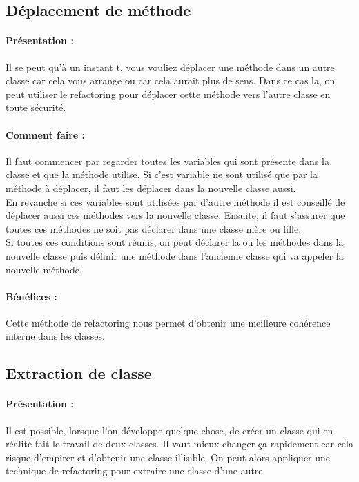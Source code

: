 \documentclass[a4paper,twoside,12pt,openright]{report}
\begin{document}
\subsection{Déplacement de méthode}
\paragraph{Présentation :}
Il se peut qu'à un instant t, vous vouliez déplacer une méthode dans un autre classe car cela vous arrange ou car cela aurait plus de sens. Dans ce cas la, on peut utiliser le refactoring pour déplacer cette méthode vers l'autre classe en toute sécurité.

\paragraph{Comment faire :}
Il faut commencer par regarder toutes les variables qui sont présente dans la classe et que la méthode utilise. Si c'est variable ne sont utilisé que par la méthode à déplacer, il faut les déplacer dans la nouvelle classe aussi.\\
En revanche si ces variables sont utilisées par d'autre méthode il est conseillé de déplacer aussi ces méthodes vers la nouvelle classe.
Ensuite, il faut s'assurer que toutes ces méthodes ne soit pas déclarer dans une classe mère ou fille.\\
Si toutes ces conditions sont réunis, on peut déclarer la ou les méthodes dans la nouvelle classe puis définir une méthode dans l'ancienne classe qui va appeler la nouvelle méthode.

\paragraph{Bénéfices :}
Cette méthode de refactoring nous permet d'obtenir une meilleure cohérence interne dans les classes.\\

\subsection{Extraction de classe}
\paragraph{Présentation :}
Il est possible, lorsque l'on développe quelque chose, de créer un classe qui en réalité fait le travail de deux classes. Il vaut mieux changer ça rapidement car cela risque d'empirer et d'obtenir une classe illisible. On peut alors appliquer une technique de refactoring pour extraire une classe d'une autre.
\end{document}

